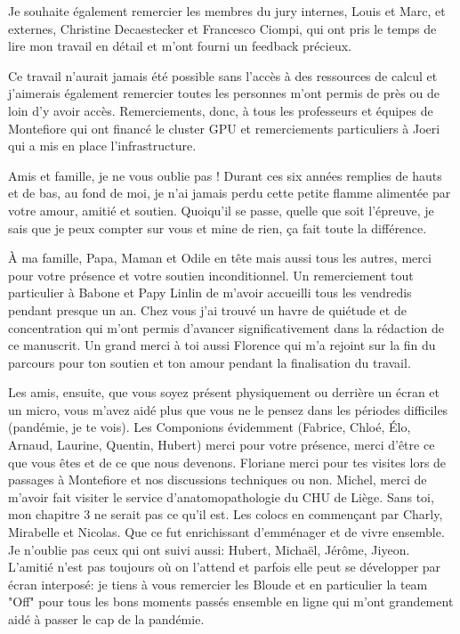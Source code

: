 \vspace{15pt}

Je souhaite également remercier les membres du jury internes, Louis et Marc, et externes, Christine Decaestecker et Francesco Ciompi, qui ont pris le temps de lire mon travail en détail et m'ont fourni un feedback précieux.

\vspace{15pt}

Ce travail n'aurait jamais été possible sans l'accès à des ressources de calcul et j'aimerais également remercier toutes les personnes m'ont permis de près ou de loin d'y avoir accès. Remerciements, donc, à tous les professeurs et équipes de Montefiore qui ont financé le cluster GPU et remerciements particuliers à Joeri qui a mis en place l'infrastructure.  

\vspace{15pt} 

Amis et famille, je ne vous oublie pas ! Durant ces six années remplies de hauts et de bas, au fond de moi, je n'ai jamais perdu cette petite flamme alimentée par votre amour, amitié et soutien. Quoiqu'il se passe, quelle que soit l'épreuve, je sais que je peux compter sur vous et mine de rien, ça fait toute la différence. 

À ma famille, Papa, Maman et Odile en tête mais aussi tous les autres, merci pour votre présence et votre soutien inconditionnel. Un remerciement tout particulier à Babone et Papy Linlin de m'avoir accueilli tous les vendredis pendant presque un an. Chez vous j'ai trouvé un havre de quiétude et de concentration qui m'ont permis d'avancer significativement dans la rédaction de ce manuscrit. Un grand merci à toi aussi Florence qui m'a rejoint sur la fin du parcours pour ton soutien et ton amour pendant la finalisation du travail. 

Les amis, ensuite, que vous soyez présent physiquement ou derrière un écran et un micro, vous m'avez aidé plus que vous ne le pensez dans les périodes difficiles (pandémie, je te vois). Les Componions évidemment (Fabrice, Chloé, Élo, Arnaud, Laurine, Quentin, Hubert) merci pour votre présence, merci d'être ce que vous êtes et de ce que nous devenons. Floriane merci pour tes visites lors de passages à Montefiore et nos discussions techniques ou non. Michel, merci de m'avoir fait visiter le service d'anatomopathologie du CHU de Liège. Sans toi, mon chapitre 3 ne serait pas ce qu'il est. Les colocs en commençant par Charly, Mirabelle et Nicolas. Que ce fut enrichissant d'emménager et de vivre ensemble. Je n'oublie pas ceux qui ont suivi aussi: Hubert, Michaël, Jérôme, Jiyeon. L'amitié n'est pas toujours où on l'attend et parfois elle peut se développer par écran interposé: je tiens à vous remercier les Bloude et en particulier la team "Off" pour tous les bons moments passés ensemble en ligne qui m'ont grandement aidé à passer le cap de la pandémie.

